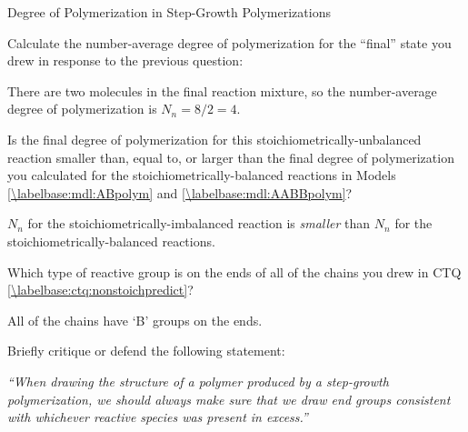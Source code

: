 \begin{activity}{Degree of Polymerization in Step-Growth Polymerizations}
\begin{ctqs}
		\question Calculate the number-average degree of polymerization for the ``final'' state you drew in response to the previous question:
		
		\begin{solution}[1in]
			There are two molecules in the final reaction mixture, so the number-average degree of polymerization is $N_n = 8/2 = 4$.
		\end{solution}
		
		\question Is the final degree of polymerization for this stoichiometrically-unbalanced reaction smaller than, equal to, or larger than the final degree of polymerization you calculated for the stoichiometrically-balanced reactions in Models \ref{\labelbase:mdl:ABpolym} and \ref{\labelbase:mdl:AABBpolym}?
		
		\begin{solution}[1in]
			$N_n$ for the stoichiometrically-imbalanced reaction is \emph{smaller} than $N_n$ for the stoichiometrically-balanced reactions.
		\end{solution}
		
		\question Which type of reactive group is on the ends of all of the chains you drew in CTQ \ref{\labelbase:ctq:nonstoichpredict}?
		
		\begin{solution}[0.5in]
			All of the chains have `B' groups on the ends.
		\end{solution}
		
		\question Briefly critique or defend the following statement:
		
			\emph{``When drawing the structure of a polymer produced by a step-growth polymerization, we should always make sure that we draw end groups consistent with whichever reactive species was present in excess.''}
		
		\begin{solution}[1.85in]
		\end{solution}
			

\end{ctqs}
\end{activity}
